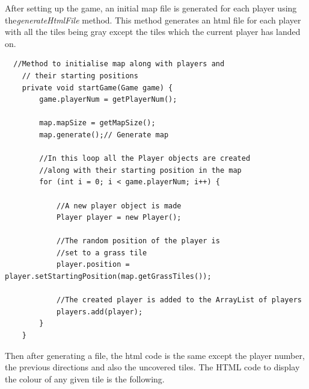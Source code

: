 \documentclass[a4paper,12pt]{extarticle}
\begin{document}
\noindent After setting up the game, an initial map file is generated for each player using the\textit{generateHtmlFile} method. This method generates an html file for each player with all the tiles being gray except the tiles which the current player has landed on.\\
\newpage
\begin{lstlisting}
  //Method to initialise map along with players and
    // their starting positions
    private void startGame(Game game) {
        game.playerNum = getPlayerNum();

        map.mapSize = getMapSize();
        map.generate();// Generate map

        //In this loop all the Player objects are created 
        //along with their starting position in the map
        for (int i = 0; i < game.playerNum; i++) {

            //A new player object is made
            Player player = new Player();

            //The random position of the player is 
            //set to a grass tile
            player.position = player.setStartingPosition(map.getGrassTiles());

            //The created player is added to the ArrayList of players
            players.add(player);
        }
    }
\end{lstlisting}
\vspace{4mm}

\noindent Then after generating a file, the html code is the same except the player number, the previous directions and also the uncovered tiles. The HTML code to display the colour of any given tile is the following.
\end{document}

